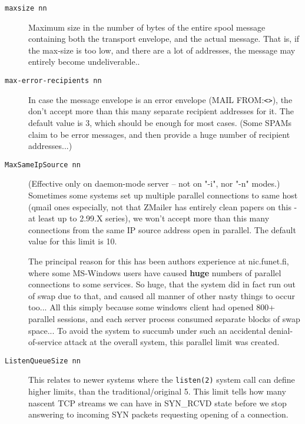 \begin{description}
\item[{\tt maxsize nn}] \mbox{}

Maximum size in the number of bytes of the entire spool message
containing both the transport envelope, and the actual message.
That is, if the max-size is too low, and there are a lot of
addresses, the message may entirely become undeliverable..



\item[{\tt max-error-recipients nn}] \mbox{}

In case the message envelope is an error envelope (MAIL FROM:{\verb/<>/}),
the don't accept more than this many separate recipient addresses
for it. The default value is 3, which should be enough for most cases.
(Some SPAMs claim to be error messages, and then provide a huge
number of recipient addresses...)



\item[{\tt MaxSameIpSource nn}] \mbox{}

(Effective only on daemon-mode server -- not on "-i", nor "-n" modes.)
Sometimes some systems set up multiple parallel connections to same
host  (qmail ones especially, not that ZMailer has entirely clean
papers on this - at least up to 2.99.X series), we won't accept
more than this many connections from the same IP source address
open in parallel.  The default value for this limit is 10.

The principal reason for this has been authors experience at nic.funet.fi,
where some MS-Windows users have caused {\bf huge} numbers
of parallel connections to some services.  So huge, that the system
did in fact run out of swap due to that, and caused all manner of
other nasty things to occur too...  All this simply because some
windows client had opened 800+ parallel sessions, and each server
process consumed separate blocks of swap space...  To avoid the
system to succumb under such an accidental denial-of-service attack
at the overall system, this parallel limit was created.



\item[{\tt ListenQueueSize nn}] \mbox{}

This relates to newer systems where the {\tt listen(2)} system call
can define higher limits, than the traditional/original 5.
This limit tells how many nascent TCP streams we can have in
SYN\_RCVD state before we stop answering to incoming SYN packets
requesting opening of a connection.


\end{description}
